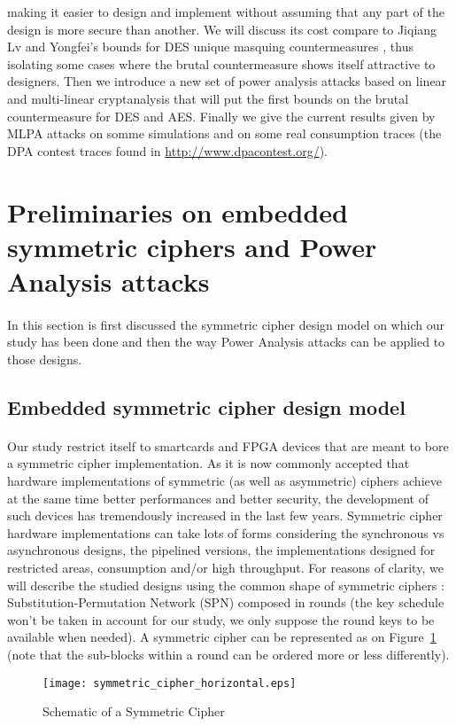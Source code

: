 \documentclass[11pt,a4paper]{article}
\begin{document}
making it easier to design and implement without assuming that any part of the design is
more secure than another. We will discuss its cost compare to Jiqiang Lv and Yongfei's bounds for DES unique masquing countermeasures \cite{JiqiangLvYongfei05}, thus
isolating some cases where the brutal countermeasure shows itself attractive to designers. Then we introduce a new set of power analysis attacks based on
linear and multi-linear cryptanalysis that will put the first bounds on the brutal countermeasure for DES and AES. Finally we give the current results given by MLPA attacks
on somme simulations and on some real consumption traces (the DPA contest traces found in \url{http://www.dpacontest.org/}).

\section{Preliminaries on embedded symmetric ciphers and Power Analysis attacks}      
\paragraph{}
In this section is first discussed the symmetric cipher design model on which our study has been done and then the way Power Analysis attacks can be applied to those designs.
\subsection{Embedded symmetric cipher design model}
\paragraph{}
Our study restrict itself to smartcards and FPGA devices that are meant to bore a symmetric cipher implementation. As it is now commonly accepted that hardware implementations of 
symmetric (as well as asymmetric) ciphers achieve at the same time better performances and better security, the development of such devices has tremendously increased in the last few
years. Symmetric cipher hardware implementations can take lots of forms considering the synchronous vs asynchronous designs, the pipelined versions, the implementations 
designed for restricted areas, consumption and/or high throughput. For reasons of clarity, we will describe the studied designs using the common 
shape of symmetric ciphers : Substitution-Permutation Network (SPN) composed in rounds (the key schedule won't be taken in account for our study, we only suppose the round keys
to be available when needed). A symmetric cipher can be represented as on Figure~\ref{fig:generic_cipher} (note that the sub-blocks within a round can be ordered more or less differently).
\begin{figure}[h!]
\begin{center}
  \texttt{[image: symmetric\_cipher\_horizontal.eps]}
\end{center}
\caption{Schematic of a Symmetric Cipher}
\label{fig:generic_cipher}
\end{figure}
\end{document}
